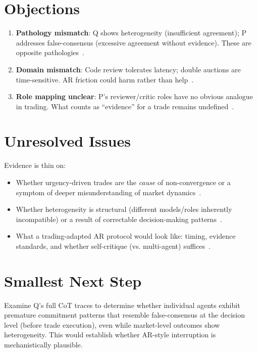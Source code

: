 \documentclass{article}
\begin{document}
\section*{Objections}

\begin{enumerate}
  \item \textbf{Pathology mismatch}: Q shows heterogeneity (insufficient agreement); P addresses false-consensus (excessive agreement without evidence). These are opposite pathologies~.
  \item \textbf{Domain mismatch}: Code review tolerates latency; double auctions are time-sensitive. AR friction could harm rather than help~.
  \item \textbf{Role mapping unclear}: P's reviewer/critic roles have no obvious analogue in trading. What counts as ``evidence'' for a trade remains undefined~.
\end{enumerate}

\section*{Unresolved Issues}

Evidence is thin on:

\begin{itemize}
  \item Whether urgency-driven trades are the \emph{cause} of non-convergence or a symptom of deeper misunderstanding of market dynamics~.
  \item Whether heterogeneity is structural (different models/roles inherently incompatible) or a result of correctable decision-making patterns~.
  \item What a trading-adapted AR protocol would look like: timing, evidence standards, and whether self-critique (vs. multi-agent) suffices~.
\end{itemize}

\section*{Smallest Next Step}

Examine Q's full CoT traces to determine whether individual agents exhibit premature commitment patterns that resemble false-consensus at the decision level (before trade execution), even while market-level outcomes show heterogeneity. This would establish whether AR-style interruption is mechanistically plausible.
\end{document}
